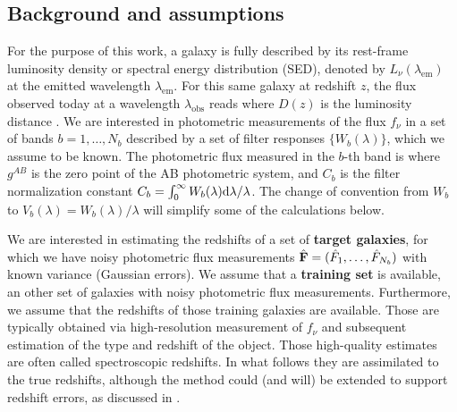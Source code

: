 \documentclass[aps,prd,showpacs,superscriptaddress,groupedaddress]{revtex4}  %
\begin{document}
\subsection{Background and assumptions}

For the purpose of this work, a galaxy is fully described by its rest-frame luminosity density or spectral energy distribution (SED), denoted by $L_\nu(\lambda_\mathrm{em})$ at the emitted wavelength $\lambda_\mathrm{em}$.
For this same galaxy at redshift $z$, the flux observed today at a wavelength $\lambda_\mathrm{obs}$ reads
where $D(z)$ is the luminosity distance \cite{Hogg:2002yh}. 
We are interested in photometric measurements of the flux $f_\nu$ in a set of bands $b=1, \dots, N_b$ described by a set of filter responses $\{ W_b(\lambda) \}$, which we assume to be known.
The photometric flux measured in the $b$-th band is
where $g^{AB}$ is the zero point of the AB photometric system, and $C_b$ is the filter normalization constant $C_b = \int_0^\infty W_b(\lambda) \mathrm{d}\lambda / \lambda$. The change of convention from $W_b$ to  $V_b(\lambda) = W_b(\lambda)/\lambda$ will simplify some of the calculations below.

We are interested in estimating the redshifts of a set of {\bf target galaxies}, for which we have noisy photometric flux measurements $\hat{\mat{F}}=(\hat{F}_1, \dots, \hat{F}_{N_b})$ with known variance (\eg Gaussian errors). 
We assume that a {\bf training set} is available, \ie an other set of galaxies with noisy photometric flux measurements.
Furthermore, we assume that the redshifts of those training galaxies are available.
Those are typically obtained via high-resolution measurement of $f_\nu$ and subsequent estimation of the type and redshift of the object.
Those high-quality estimates are often called spectroscopic redshifts.
In what follows they are assimilated to the true redshifts, although the method could (and will) be extended to support redshift errors, as discussed in . 
\end{document}
